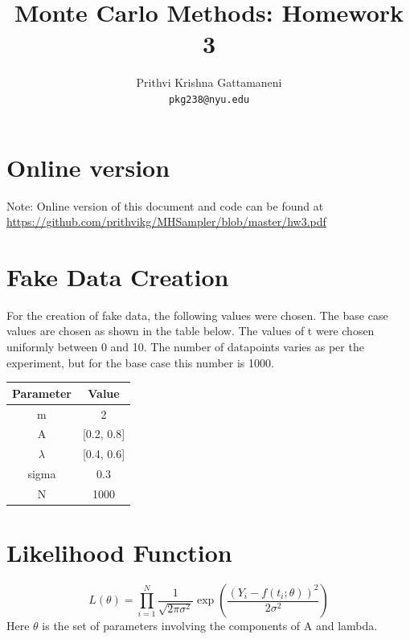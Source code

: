 \documentclass{article}
\title{Monte Carlo Methods: Homework 3}
\author{
  Prithvi Krishna Gattamaneni\\
  \texttt{pkg238@nyu.edu} \\
}
\begin{document}
\maketitle
\section{Online version}
Note: Online version of this document and code can be found at \url{https://github.com/prithvikg/MHSampler/blob/master/hw3.pdf}

\section{Fake Data Creation} %
For the creation of fake data, the following values were chosen. The base case values are chosen as shown in the table below. The values of t were chosen uniformly between 0 and 10. The number of datapoints varies as per the experiment, but for the base case this number is 1000.\\
\begin{center}
	\begin{tabular}{ |c| c| }
		\hline
		Parameter & Value\\
		\hline
		m & 2 \\ 
		A & [0.2, 0.8] \\  
		$\lambda$ & [0.4, 0.6]\\
		sigma & 0.3 \\
		N & 1000\\
		\hline
	\end{tabular}
\end{center}


\section{Likelihood Function} %
\[
L(\theta) = \prod_{i=1}^{N} \frac{1}{\sqrt{2\pi\sigma^2}}\exp\left( \frac{(Y_i - f(t_i;\theta))^2}{2\sigma^2} \right)
\]
Here $\theta$ is the set of parameters involving the components of A and lambda.
\end{document}
